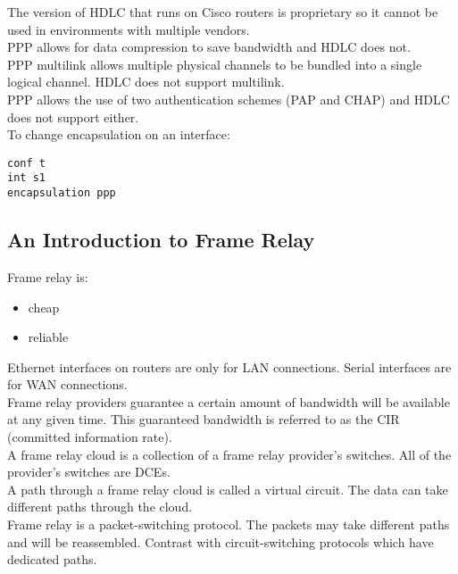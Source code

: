The version of HDLC that runs on Cisco routers is proprietary so it cannot
be used in environments with multiple vendors.\\

PPP allows for data compression to save bandwidth and HDLC does not.\\

PPP multilink allows multiple physical channels to be bundled into a single
logical channel. HDLC does not support multilink.\\

PPP allows the use of two authentication schemes (PAP and CHAP) and HDLC
does not support either.\\

To change encapsulation on an interface:

\begin{verbatim}
conf t
int s1
encapsulation ppp
\end{verbatim}

\subsection{An Introduction to Frame Relay}

Frame relay is:

\begin{itemize}
\item cheap
\item reliable
\end{itemize}

Ethernet interfaces on routers are only for LAN connections. Serial interfaces
are for WAN connections.\\

Frame relay providers guarantee a certain amount of bandwidth will be
available at any given time. This guaranteed bandwidth is referred to as
the CIR (committed information rate).\\

A frame relay cloud is a collection of a frame relay provider's switches.
All of the provider's switches are DCEs.\\

A path through a frame relay cloud is called a virtual circuit. The data
can take different paths through the cloud.\\

Frame relay is a packet-switching protocol. The packets may take different
paths and will be reassembled. Contrast with circuit-switching protocols
which have dedicated paths.\\

